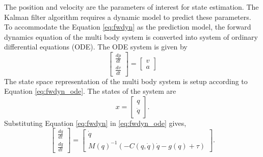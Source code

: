 The position and velocity are the parameters of interest for state estimation. The Kalman filter algorithm requires a dynamic model to predict these parameters. To accommodate the Equation \ref{eq:fwdyn} as the prediction model, the forward dynamics equation of the multi body system is converted into system of ordinary differential equations (ODE). The ODE system is given by
\begin{equation}
    \label{eq:fwdyn_ode}
    \begin{bmatrix} \frac{dp}{dt}  \\ \frac{dv}{dt} \end{bmatrix} = 
    \begin{bmatrix} v \\ a \end{bmatrix}
\end{equation}
 The state space representation of the multi body system is setup according to Equation \ref{eq:fwdyn_ode}. The states of the system are
\begin{equation}
    x = \begin{bmatrix} q \\ \dot q \end{bmatrix}.
\end{equation}
Substituting Equation \ref{eq:fwdyn} in \ref{eq:fwdyn_ode} gives, 
\begin{equation}
    \label{eq:dyn_ss}
    \begin{bmatrix} \frac{dq}{dt} \\ \frac{d \dot q}{dt} \end{bmatrix} =
    \begin{bmatrix}
    \dot q \\
    M(q)^{-1} \left( -C(q,\dot{q})\dot{q} - g(q) + \tau \right )
    \end{bmatrix}.
\end{equation}


